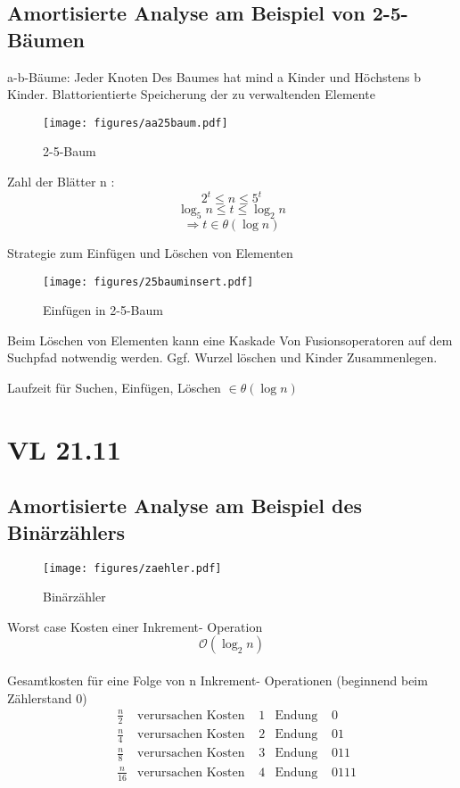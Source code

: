 \documentclass[a4paper,draft,twoside,10pt]{report}
\begin{document}
\section{Amortisierte Analyse am Beispiel von 2-5-Bäumen}
a-b-Bäume: Jeder Knoten Des Baumes hat mind a Kinder und Höchstens b Kinder.
Blattorientierte Speicherung der zu verwaltenden Elemente
\begin{figure}[H]\center
\texttt{[image: figures/aa25baum.pdf]}
\caption{2-5-Baum}
\end{figure}
Zahl der Blätter n :
\[2^t\le n\le 5^t\]
\[\log_5n \le t\le  \log_2n\]
\[\Rightarrow t\in \theta (\log n)\]

Strategie zum Einfügen und Löschen von Elementen

\begin{figure}[H]
\texttt{[image: figures/25bauminsert.pdf]}
\caption{Einfügen in 2-5-Baum}
\end{figure}

Beim Löschen von Elementen kann eine Kaskade Von Fusionsoperatoren auf dem Suchpfad notwendig werden. Ggf. Wurzel löschen und Kinder Zusammenlegen.

Laufzeit für Suchen, Einfügen, Löschen $\in \theta(\log n)$

\chapter{VL 21.11}
\section{Amortisierte Analyse am Beispiel des Binärzählers}

\begin{figure}[H]\center
\texttt{[image: figures/zaehler.pdf]}
\caption{Binärzähler}
\end{figure}

Worst case Kosten einer Inkrement- Operation $$\mathcal O(\log_2n)$$\\
Gesamtkosten für eine Folge von n Inkrement- Operationen (beginnend beim Zählerstand 0)
\begin{align*}
&\frac{n}{2}&\mbox{verursachen Kosten }&1&\mbox{Endung }&0\\
&\frac{n}{4}&\mbox{verursachen Kosten }&2&\mbox{Endung }&01\\
&\frac{n}{8}&\mbox{verursachen Kosten }&3&\mbox{Endung }&011\\
&\frac{n}{16}&\mbox{verursachen Kosten }&4&\mbox{Endung }&0111\\
\end{align*}
\end{document}
